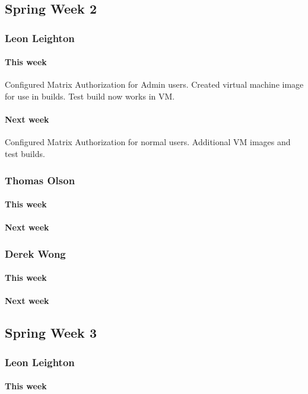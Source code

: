 \documentclass[10pt,letterpaper,onecolumn,draftclsnofoot]{IEEEtran}
\begin{document}
\subsection{Spring Week 2}
\subsubsection{Leon Leighton}
\paragraph{This week}Configured Matrix Authorization for Admin users.    
Created virtual machine image for use in builds. Test build now works in VM.
\paragraph{Next week}Configured Matrix Authorization for normal users.  
Additional VM images and test builds.

\subsubsection{Thomas Olson}
\paragraph{This week}
\paragraph{Next week}

\subsubsection{Derek Wong}
\paragraph{This week}
\paragraph{Next week}

\subsection{Spring Week 3}
\subsubsection{Leon Leighton}
\paragraph{This week}
\end{document}
